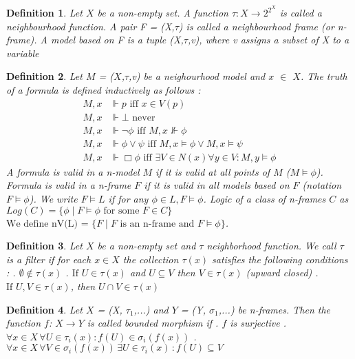 \documentclass[12pt, a4paper]{scrartcl}
\newtheorem{definition}{Definition}[subsection]
\begin{document}
\begin{definition}
    Let $X$ be a non-empty set. A function  $\tau : X \rightarrow 2^{2^X}$ is called a neighbourhood function. A pair 
    F = (X,$\tau$) is called a neighbourhood frame (or n-frame). A model based on F is a tuple (X,$\tau$,v), where v assigns a subset of X to a variable
        
\end{definition}

\begin{definition}
    Let $M$ = ($X$,$\tau$,v) be a neighourhood model and $x$ $\in$ $X$. The truth of a formula is defined inductively as follows :
    \begin{align*}
        M,x &\Vdash p \mbox{ iff } x \in V(p)\\
        M,x &\Vdash \bot \mbox{ never } \\
        M,x &\Vdash \neg \phi \mbox{ iff } M,x \nVdash \phi\\
        M,x &\Vdash \phi \lor \psi \mbox{ iff } M,x \vDash \phi \lor M,x \vDash \psi\\
        M,x &\Vdash \Box \phi \mbox{ iff } \exists V \in N(x) \forall y \in V : M,y \models \phi
    \end{align*}
    A formula is valid in a n-model $M$ if it is valid at all points of $M$ ($M \vDash \phi$). Formula is valid in a n-frame $F$ if it is valid in
    all models based on $F$ (notation $F \vDash \phi$). We write $F \vDash L$ if for any $\phi \in L, F \vDash \phi$. Logic of a class of n-frames $C$ as $Log(C) = \{\phi \mid F \vDash \phi \mbox{ for some } F \in C\}$
    $\mbox{We define nV(L) =  } \{ F \mid F \mbox{ is an n-frame and } F \models \phi \}$.
\end{definition}

\begin{definition}
    Let $X$ be a non-empty set and $\tau$ neighborhood function. We call $\tau$ is a filter if for each $x\in X$ the collection $\tau(x)$
    satisfies the following conditions : \newline {}. $\emptyset \notin \tau(x)$ . $\mbox{If }U \in \tau(x)$ and $U \subseteq V$ then $V \in \tau(x)$ (upward closed) . $\mbox{If }U, V \in \tau(x)$, then $U \cap V \in \tau(x)$
\end{definition}

\begin{definition}
    Let $X$ = (X, $\tau_1$,...) and $Y$ = (Y, $\sigma_1$,...) be n-frames. Then the function $f$:
    $X \rightarrow Y$ is called bounded morphism if \newline {}. $f$ is surjective . $\forall x\in X \, \forall U \in \tau_i(x) : f(U) \in \sigma_i (f(x))$ . $\forall x\in X \, \forall V \in \sigma_i (f(x)) \, \exists U \in \tau_i(x) \, : f(U) \subseteq V$        
\end{definition}
\end{document}
